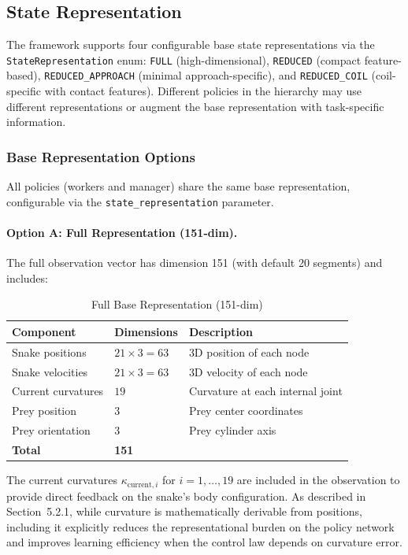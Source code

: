 \documentclass[11pt]{article}
\begin{document}
\subsection{State Representation}

The framework supports four configurable base state representations via the \texttt{StateRepresentation} enum: \texttt{FULL} (high-dimensional), \texttt{REDUCED} (compact feature-based), \texttt{REDUCED\_APPROACH} (minimal approach-specific), and \texttt{REDUCED\_COIL} (coil-specific with contact features). Different policies in the hierarchy may use different representations or augment the base representation with task-specific information.

\subsubsection{Base Representation Options}

All policies (workers and manager) share the same base representation, configurable via the \texttt{state\_representation} parameter.

\paragraph{Option A: Full Representation (151-dim).}
The full observation vector has dimension 151 (with default 20 segments) and includes:

\begin{table}[H]
\centering
\caption{Full Base Representation (151-dim)}
\begin{tabular}{@{}lll@{}}
\toprule
\textbf{Component} & \textbf{Dimensions} & \textbf{Description} \\
\midrule
Snake positions & $21 \times 3 = 63$ & 3D position of each node \\
Snake velocities & $21 \times 3 = 63$ & 3D velocity of each node \\
Current curvatures & $19$ & Curvature at each internal joint \\
Prey position & 3 & Prey center coordinates \\
Prey orientation & 3 & Prey cylinder axis \\
\midrule
\textbf{Total} & \textbf{151} & \\
\bottomrule
\end{tabular}
\end{table}

The current curvatures $\kappa_{\text{current}, i}$ for $i = 1, \ldots, 19$ are included in the observation to provide direct feedback on the snake's body configuration. As described in Section~5.2.1, while curvature is mathematically derivable from positions, including it explicitly reduces the representational burden on the policy network and improves learning efficiency when the control law depends on curvature error.
\end{document}
